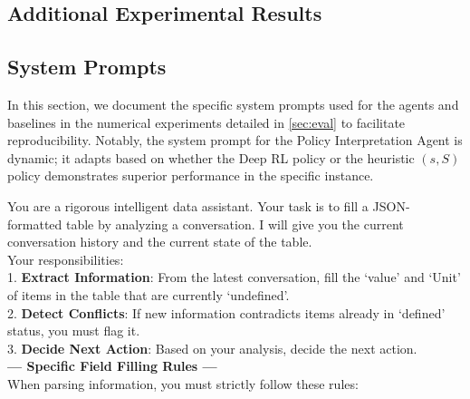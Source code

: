 \documentclass[mnsc,nonblindrev]{informs3_hide}
\begin{document}
\begin{APPENDICES}
\newpage

\section{Additional Experimental Results}

\subsection{System Prompts}\label{sec:system_prompts}

In this section, we document the specific system prompts used for the agents and baselines in the numerical experiments detailed in \cref{sec:eval} to facilitate reproducibility. Notably, the system prompt for the Policy Interpretation Agent is dynamic; it adapts based on whether the Deep RL policy or the heuristic $(s, S)$ policy demonstrates superior performance in the specific instance.

\begin{table}[h]
    \centering
    \begin{tcolorbox}
    \scriptsize
    You are a rigorous intelligent data assistant. Your task is to fill a JSON-formatted table by analyzing a conversation.
    I will give you the current conversation history and the current state of the table.\\

    Your responsibilities: \\
    1. \textbf{Extract Information}: From the latest conversation, fill the `value' and `Unit' of items in the table that are currently `undefined'. \\
    2. \textbf{Detect Conflicts}: If new information contradicts items already in `defined' status, you must flag it. \\
    3. \textbf{Decide Next Action}: Based on your analysis, decide the next action.\\

    \textbf{--- Specific Field Filling Rules ---} \\
    When parsing information, you must strictly follow these rules:\\[0.5em]


\end{tcolorbox}
\end{table}
\end{APPENDICES}
\end{document}
